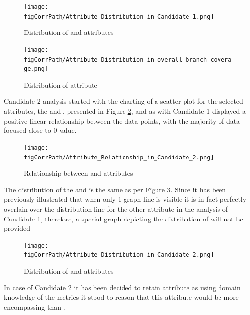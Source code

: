 \begin{enumerate}
\begin{landscape}
\begin{figure}
\centering
\begin{minipage}{0.89\textwidth}
  \centering
  \texttt{[image: \\figCorrPath/Attribute\_Distribution\_in\_Candidate\_1.png]}
    \caption{Distribution of \overallBranchCoverage{} and \branchCoverage{} attributes}
    \label{fig:candidate1-distribution}
\end{minipage}%
\begin{minipage}{0.89\textwidth}
   \texttt{[image: \\figCorrPath/Attribute\_Distribution\_in\_overall\_branch\_coverage.png]}
    \caption{Distribution of \overallBranchCoverage{} attribute}
    \label{fig:candidate1-attrib2-distribution}
\end{minipage}
\end{figure}
\end{landscape}
\FloatBarrier

Candidate 2 analysis started with the charting of a scatter plot for the selected attributes, the \overallUncoveredLines{} and \uncoveredLines{}, presented in Figure \ref{fig:candidate2-scatterplot}, and as with Candidate 1 displayed a positive linear relationship between the data points, with the majority of data focused close to 0 value.

\begin{figure}[!h]
    \centering
    \texttt{[image: \\figCorrPath/Attribute\_Relationship\_in\_Candidate\_2.png]}
    \caption{Relationship between \overallUncoveredLines{} and \uncoveredLines{} attributes}
    \label{fig:candidate2-scatterplot}
\end{figure}

The distribution of the \overallUncoveredLines{} and \uncoveredLines{} is the same as per Figure \ref{fig:candidate2-distribution}. Since it has been previously illustrated that when only 1 graph line is visible it is in fact perfectly overlain over the distribution line for the other attribute in the analysis of Candidate 1, therefore, a special graph depicting the distribution of \uncoveredLines{} will not be provided.
\begin{figure}
    \centering
  \texttt{[image: \\figCorrPath/Attribute\_Distribution\_in\_Candidate\_2.png]}
    \caption{Distribution of \overallUncoveredLines{} and \uncoveredLines{} attributes}
    \label{fig:candidate2-distribution}
\end{figure}
In case of Candidate 2 it  has been decided to retain \overallUncoveredLines{} attribute as using domain knowledge of the metrics it stood to reason that this attribute would be more encompassing than \uncoveredLines{}.
\FloatBarrier


\end{enumerate}

